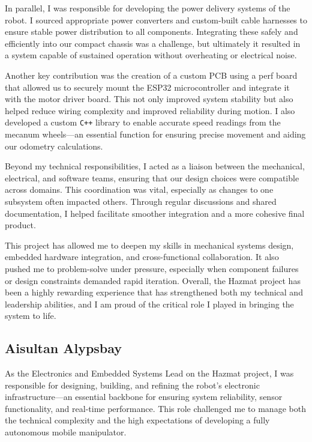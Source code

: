 \documentclass{article}
\begin{document}
\begin{appendices}
In parallel, I was responsible for developing the power delivery systems of the robot. I sourced appropriate power converters and custom-built cable harnesses to ensure stable power distribution to all components. Integrating these safely and efficiently into our compact chassis was a challenge, but ultimately it resulted in a system capable of sustained operation without overheating or electrical noise.

Another key contribution was the creation of a custom PCB using a perf board that allowed us to securely mount the ESP32 microcontroller and integrate it with the motor driver board. This not only improved system stability but also helped reduce wiring complexity and improved reliability during motion. I also developed a custom \texttt{C++} library to enable accurate speed readings from the mecanum wheels---an essential function for ensuring precise movement and aiding our odometry calculations.

Beyond my technical responsibilities, I acted as a liaison between the mechanical, electrical, and software teams, ensuring that our design choices were compatible across domains. This coordination was vital, especially as changes to one subsystem often impacted others. Through regular discussions and shared documentation, I helped facilitate smoother integration and a more cohesive final product.

This project has allowed me to deepen my skills in mechanical systems design, embedded hardware integration, and cross-functional collaboration. It also pushed me to problem-solve under pressure, especially when component failures or design constraints demanded rapid iteration. Overall, the Hazmat project has been a highly rewarding experience that has strengthened both my technical and leadership abilities, and I am proud of the critical role I played in bringing the system to life.

\subsection*{Aisultan Alypsbay}

As the Electronics and Embedded Systems Lead on the Hazmat project, I was responsible for designing, building, and refining the robot's electronic infrastructure---an essential backbone for ensuring system reliability, sensor functionality, and real-time performance. This role challenged me to manage both the technical complexity and the high expectations of developing a fully autonomous mobile manipulator.


\end{appendices}
\end{document}
